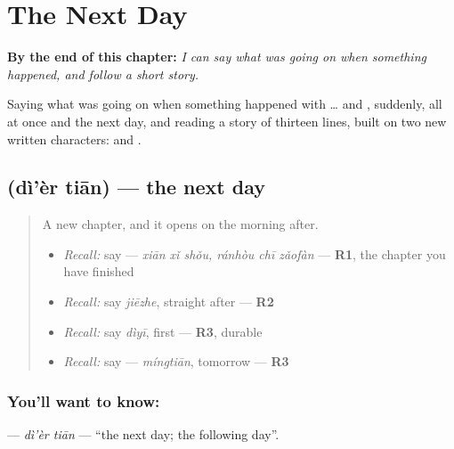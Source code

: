 
\chapter{The Next Day}
\label{ch:zh-the-next-day}

\begin{chapteropening}
\textbf{By the end of this chapter:} \emph{I can say what was going on when something happened, and follow a short story.}

Saying what was going on when something happened with … and , suddenly, all at once and the next day, and reading a story of thirteen lines, built on two new written characters:  and .
\end{chapteropening}

\section[\texorpdfstring{\zh{第二天} (dì'èr tiān)}{第二天 (dì'èr tiān)}]{ (dì'èr tiān) — the next day}

\label{lesson:ZH-C279-dier-tian}



\begin{quote}
A new chapter, and it opens on the morning after.

\begin{itemize}
\raggedright
  \item \emph{Recall:} say   — \emph{xiān xǐ shǒu, ránhòu chī zǎofàn} — \textbf{R1}, the chapter you have finished
  \item \emph{Recall:} say \emph{jiēzhe}, straight after — \textbf{R2}
  \item \emph{Recall:} say \emph{dìyī}, first — \textbf{R3}, durable
  \item \emph{Recall:} say  — \emph{míngtiān}, tomorrow — \textbf{R3}
\end{itemize}
\end{quote}

\subsection*{You'll want to know: }
\textbf{} — \emph{dì'èr tiān} — \textquotedblleft{}the next day; the following day\textquotedblright{}.

